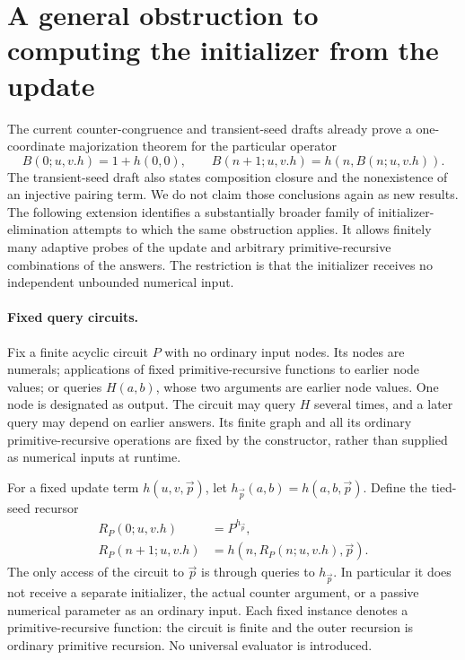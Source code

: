 \section{A general obstruction to computing the initializer from the update}
\label{sec:tied-seed-circuits}

The current counter-congruence and transient-seed drafts already prove a
one-coordinate majorization theorem for the particular operator
\[
 B(0;u,v.h)=1+h(0,0),\qquad
 B(n+1;u,v.h)=h(n,B(n;u,v.h)).
\]
The transient-seed draft also states composition closure and the
nonexistence of an injective pairing term. We do not claim those
conclusions again as new results. The following extension
identifies a substantially broader family of initializer-elimination
attempts to which the same obstruction applies. It allows finitely many
adaptive probes of the update and arbitrary primitive-recursive
combinations of the answers. The restriction is that the initializer
receives no independent unbounded numerical input.

\paragraph{Fixed query circuits.}
Fix a finite acyclic circuit $P$ with no ordinary input nodes. Its nodes
are numerals; applications of fixed primitive-recursive functions to
earlier node values; or queries $H(a,b)$, whose two arguments are earlier
node values. One node is designated as output. The circuit may query $H$
several times, and a later query may depend on earlier answers. Its finite
graph and all its ordinary primitive-recursive operations are fixed by
the constructor, rather than supplied as numerical inputs at runtime.

For a fixed update term $h(u,v,\vec p)$, let
$h_{\vec p}(a,b)=h(a,b,\vec p)$. Define the tied-seed recursor
\[
 \begin{split}
 R_P(0;u,v.h)&=P^{h_{\vec p}},\\
 R_P(n+1;u,v.h)&=h(n,R_P(n;u,v.h),\vec p).
 \end{split}
 \tag{Tied seed}
\]
The only access of the circuit to $\vec p$ is through queries to
$h_{\vec p}$. In particular it does not receive a separate initializer,
the actual counter argument, or a passive numerical parameter as an
ordinary input. Each fixed instance denotes a primitive-recursive
function: the circuit is finite and the outer recursion is ordinary
primitive recursion. No universal evaluator is introduced.

